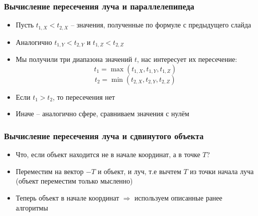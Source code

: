 \documentclass[10pt]{beamer}
\begin{document}
\begin{frame}
\frametitle{Вычисление пересечения луча и параллелепипеда}
\begin{itemize}
\item Пусть \begin{math}t_{1,X} < t_{2,X}\end{math} -- значения, полученные по формуле с предыдущего слайда
\pause
\item Аналогично \begin{math}t_{1,Y} < t_{2,Y}\end{math} и \begin{math}t_{1,Z} < t_{2,Z}\end{math}
\pause
\item Мы получили три диапазона значений \begin{math}t\end{math}, нас интересует их пересечение:
\begin{equation}
t_1 = \max(t_{1,X}, t_{1,Y}, t_{1,Z})
\end{equation}
\begin{equation}
t_2 = \min(t_{2,X}, t_{2,Y}, t_{2,Z})
\end{equation}
\pause
\item Если \begin{math}t_1 > t_2\end{math}, то пересечения нет
\pause
\item Иначе -- аналогично сфере, сравниваем значения с нулём
\end{itemize}
\end{frame}

\begin{frame}
\frametitle{Вычисление пересечения луча и сдвинутого объекта}
\begin{itemize}
\item Что, если объект находится не в начале координат, а в точке \begin{math}T\end{math}?
\pause
\item Переместим на вектор \begin{math}-T\end{math} и объект, и луч, т.е вычтем \begin{math}T\end{math} из точки начала луча  (объект переместим только мысленно)
\pause
\item Теперь объект в начале координат \begin{math}\Longrightarrow\end{math} используем описанные ранее алгоритмы
\end{itemize}
\end{frame}
\end{document}
